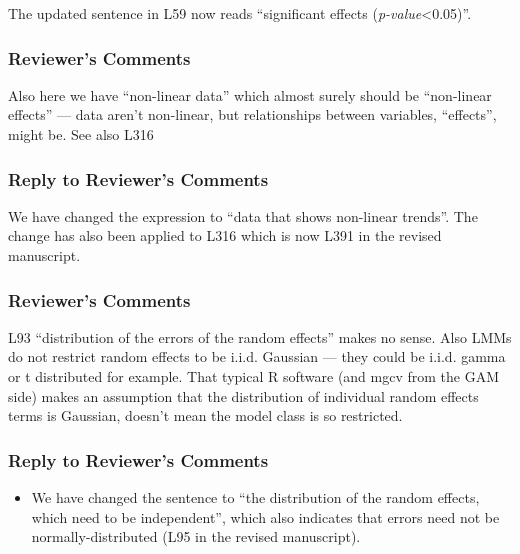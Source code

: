 \documentclass[
]{article}
\providecommand{\tightlist}{%
  \setlength{\itemsep}{0pt}\setlength{\parskip}{0pt}}
\begin{document}
The updated sentence in L59 now reads ``significant effects (\emph{p-value}\textless0.05)''.

\hypertarget{reviewers-comments-18}{%
\subsubsection{Reviewer's Comments}\label{reviewers-comments-18}}

Also here we have ``non-linear data'' which almost surely should be ``non-linear effects'' --- data aren't non-linear, but relationships between variables, ``effects'', might be. See also L316

\hypertarget{section-19}{%
\subsubsection{\texorpdfstring{\textcolor{reviewersblue} {Reply to Reviewer's Comments}}{}}\label{section-19}}

We have changed the expression to ``data that shows non-linear trends''. The change has also been applied to L316 which is now L391 in the revised manuscript.

\hypertarget{reviewers-comments-19}{%
\subsubsection{Reviewer's Comments}\label{reviewers-comments-19}}

L93 ``distribution of the errors of the random effects'' makes no sense. Also LMMs do not restrict random effects to be i.i.d. Gaussian --- they could be i.i.d. gamma or t distributed for example. That typical R software (and mgcv from the GAM side) makes an assumption that the distribution of individual random effects terms is Gaussian, doesn't mean the model class is so restricted.

\hypertarget{section-20}{%
\subsubsection{\texorpdfstring{\textcolor{reviewersblue} {Reply to Reviewer's Comments}}{}}\label{section-20}}

\begin{itemize}
\tightlist
\item
  We have changed the sentence to ``the distribution of the random effects, which need to be independent'', which also indicates that errors need not be normally-distributed (L95 in the revised manuscript).
\end{itemize}
\end{document}
